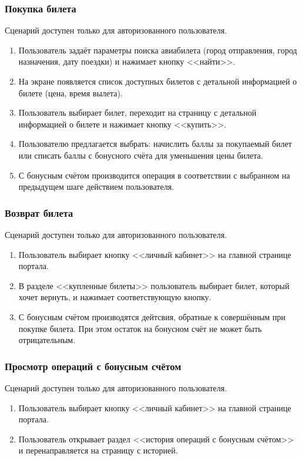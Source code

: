 \subsubsection*{Покупка билета}
Сценарий доступен только для авторизованного пользователя.
\begin{enumerate}
    \item Пользователь задаёт параметры поиска авиабилета (город отправления, город назначения, дату поездки) и нажимает кнопку <<найти>>.
    \item На экране появляется список доступных билетов с детальной информацией о билете (цена, время вылета).
    \item Пользователь выбирает билет, переходит на страницу с детальной информацией о билете и нажимает кнопку <<купить>>.
    \item Пользователю предлагается выбрать: начислить баллы за покупаемый билет или списать баллы с бонусного счёта для уменьшения цены билета.
    \item С бонусным счётом производится операция в соответствии с выбранном на предыдущем шаге действием пользователя.
\end{enumerate}

\subsubsection*{Возврат билета}
Сценарий доступен только для авторизованного пользователя.
\begin{enumerate}
    \item Пользователь выбирает кнопку <<личный кабинет>> на главной странице портала.
    \item В разделе <<купленные билеты>> пользователь выбирает билет, который хочет вернуть, и нажимает соответствующую кнопку.
    \item С бонусным счётом производятся дейтсвия, обратные к совершённым при покупке билета. При этом остаток на бонусном счёт не может быть отрицательным.
\end{enumerate}

\subsubsection*{Просмотр операций с бонусным счётом}
Сценарий доступен только для авторизованного пользователя.
\begin{enumerate}
    \item Пользователь выбирает кнопку <<личный кабинет>> на главной странице портала.
    \item Пользователь открывает раздел <<история операций с бонусным счётом>> и перенаправляется на страницу с историей.
\end{enumerate}

